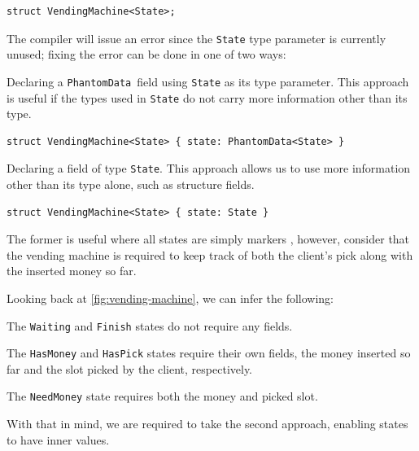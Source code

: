 \begin{verbatim}
struct VendingMachine<State>;
\end{verbatim}

The compiler will issue an error since the \texttt{State} type parameter is currently unused;
fixing the error can be done in one of two ways:
\begin{compactitem}
    \item Declaring a \texttt{PhantomData}\footnotemark~field using \texttt{State} as its type parameter.
    This approach is useful if the types used in \texttt{State} do not carry more information other than its type.
    \begin{verbatim}
struct VendingMachine<State> { state: PhantomData<State> }
    \end{verbatim}
    \item Declaring a field of type \texttt{State}.
    This approach allows us to use more information other than its type alone, such as structure fields.
    \begin{verbatim}
struct VendingMachine<State> { state: State }
    \end{verbatim}
\end{compactitem}

The former is useful where all states are simply markers ,
however, consider that the vending machine is required to keep track of both the client's pick along with the inserted money so far.

Looking back at \autoref{fig:vending-machine}, we can infer the following:
\begin{compactitem}
    \item The \textcolor{structblue}{\texttt{Waiting}} and \textcolor{structblue}{\texttt{Finish}} states do not require any fields.
    \item The \textcolor{structblue}{\texttt{HasMoney}} and \textcolor{structblue}{\texttt{HasPick}} states require their own fields,
    the money inserted so far and the slot picked by the client, respectively.
    \item The \textcolor{structblue}{\texttt{NeedMoney}} state requires both the money and picked slot.
\end{compactitem}
With that in mind, we are required to take the second approach, enabling states to have inner values.

